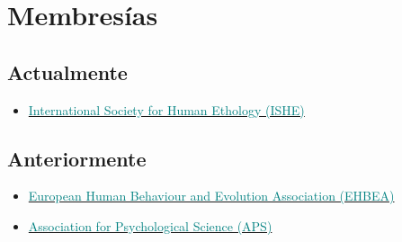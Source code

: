 \documentclass[11pt, a4paper]{awesome-cv}
\providecommand{\tightlist}{%
	\setlength{\itemsep}{0pt}\setlength{\parskip}{0pt}}
\begin{document}
\hypertarget{membresuxedas}{%
\section{Membresías}\label{membresuxedas}}

\hypertarget{actualmente}{%
\subsection{Actualmente}\label{actualmente}}

\begin{itemize}
\tightlist
\item
  \href{https://ishe.org/}{\textcolor{teal}{International Society for Human Ethology (ISHE)}}
\end{itemize}

\hypertarget{anteriormente}{%
\subsection{Anteriormente}\label{anteriormente}}

\begin{itemize}
\tightlist
\item
  \href{https://www.cambridge.org/core/membership/ehbea}{\textcolor{teal}{European Human Behaviour and Evolution Association (EHBEA)}}
\item
  \href{https://www.psychologicalscience.org/}{\textcolor{teal}{Association for Psychological Science (APS)}}
\end{itemize}
\end{document}
